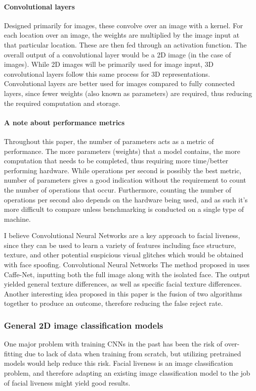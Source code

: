 \documentclass[10pt,a4paper]{article}
\begin{document}
        \paragraph{Convolutional layers} Designed primarily for images, these convolve over an image with a kernel. For each location over an image, the weights are multiplied by the image input at that particular location. These are then fed through an activation function.
        The overall output of a convolutional layer would be a 2D image (in the case of images). While 2D images will be primarily used for image input, 3D convolutional layers follow this same process for 3D representations. 
        Convolutional layers are better used for images compared to fully connected layers, since fewer weights (also known as parameters) are required, thus reducing the required computation and storage. 

        \paragraph{A note about performance metrics}
            Throughout this paper, the number of parameters acts as a metric of performance. The more parameters (weights) that a model contains, the more computation that needs to be completed, thus requiring more time/better performing hardware.
            While operations per second is possibly the best metric, number of parameters gives a good indication without the requirement to count the number of operations that occur. Furthermore, counting the number of operations per second also depends on the hardware
            being used, and as such it's more difficult to compare unless benchmarking is conducted on a single type of machine.
        
        I believe Convolutional Neural Networks are a key approach to facial liveness, since they can be used to learn a variety of features including face structure,
        texture, and other potential suspicious visual glitches which would be obtained with face spoofing. Convolutional Neural Networks 
        The method proposed in \cite{Patel2016CrossDatabaseFA} uses Caffe-Net, inputting both the full image along with the isolated face.
        The output yielded general texture differences, as well as specific facial texture differences. Another interesting idea proposed
        in this paper is the fusion of two algorithms together to produce an outcome, therefore reducing the false reject rate.
        
        \subsubsection{General 2D image classification models}
        One major problem with training CNNs in the past has been the risk of over-fitting due to lack of data when training from scratch, but utilizing pretrained models would help reduce this risk.
        Facial liveness is an image classification problem, and therefore adapting an existing image classification model to the job of facial liveness might yield good results. 
\end{document}
